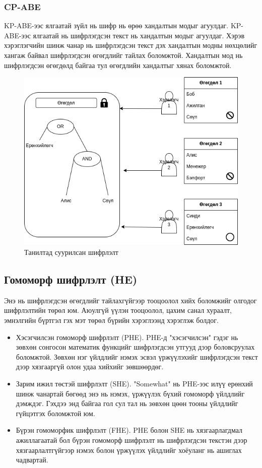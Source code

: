 \subsubsection*{CP-ABE}
KP-ABE-ээс ялгаатай зүйл нь шифр нь өрөө хандалтын модыг агуулдаг. KP-ABE-ээс ялгаатай нь шифрлэгдсэн текст нь хандалтын модыг агуулдаг. Хэрэв хэрэглэгчийн шинж чанар нь шифрлэгдсэн текст дэх хандалтын модны нөхцөлийг хангаж байвал шифрлэгдсэн өгөгдлийг тайлах боломжтой. Хандалтын мод нь шифрлэгдсэн өгөгдөлд байгаа тул өгөгдлийн хандалтыг хянах боломжтой.
\begin{figure}[ht]
    \centering
    \includegraphics[scale=0.6]{Figures/cp-abe.drawio.png}
    \caption[IBE]{Танилтад суурилсан шифрлэлт}
    \label{fig:cp-abe}
\end{figure}

\subsection*{Гомоморф шифрлэлт (HE)}

Энэ нь шифрлэгдсэн өгөгдлийг тайлахгүйгээр тооцоолол хийх боломжийг олгодог шифрлэлтийн төрөл юм. Аюулгүй үүлэн тооцоолол, цахим санал хураалт, эмнэлгийн бүртгэл гэх мэт төрөл бүрийн хэрэглээнд хэрэглэж болдог.
\cite*{WikiHE}

\begin{itemize}
    \item Хэсэгчилсэн гомоморф шифрлэлт (PHE). PHE-д "хэсэгчилсэн" гэдэг нь зөвхөн сонгосон математик функцийг шифрлэгдсэн утгууд дээр боловсруулах боломжтой. Зөвхөн нэг үйлдлийг нэмэх эсвэл үржүүлэхийг шифрлэгдсэн текст дээр хязгааргүй олон удаа хийхийг зөвшөөрдөг.
    \item Зарим ижил төстэй шифрлэлт (SHE). "Somewhat" нь PHE-ээс илүү ерөнхий шинж чанартай бөгөөд энэ нь нэмэх, үржүүлэх бүхий гомоморф үйлдлийг дэмждэг. Гэхдээ энд байгаа гол сул тал нь зөвхөн цөөн тооны үйлдлийг гүйцэтгэх боломжтой юм.
    \item Бүрэн гомоморфик шифрлэлт (FHE). PHE болон SHE нь хязгаарлагдмал ажиллагаатай бол бүрэн гомоморф шифрлэлт нь шифрлэгдсэн текстэн дээр хязгаарлалтгүйгээр нэмэх болон үржүүлэх үйлдлийг хоёуланг нь ашиглах чадвартай.
\end{itemize}

